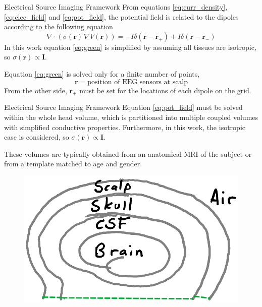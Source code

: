 \documentclass[progressbar=head]{beamer}
\newcommand{\ppar}[1]{ \left( #1 \right) }
\newcommand{\id}{\mathbf{I}}
\newcommand{\rr}{\mathbf{r}}
\begin{document}
\begin{frame}{Electrical Source Imaging Framework}
From equations \eqref{eq:curr_density}, \eqref{eq:elec_field} and \eqref{eq:pot_field}, the potential field is related to the dipoles according to the following equation
\begin{equation}
\nabla \cdot\ppar{\sigma(\rr)\, \nabla V(\rr) } = 
-I \delta\ppar{\rr-\rr_+} + I \delta\ppar{\rr-\rr_-}
\label{eq:green}
\end{equation}
In this work equation \eqref{eq:green} is simplified by assuming 
all tissues are isotropic, so $\sigma(\rr)\propto \id$.

Equation \eqref{eq:green} is solved 
only for a finite number of points, 
\begin{equation*}
    \rr = \text{position of EEG sensors at scalp}
\end{equation*}
From the other side, $\rr_\pm$ must be set for the locations of each dipole on the grid.
\end{frame}

\begin{frame}{Electrical Source Imaging Framework}
Equation \eqref{eq:pot_field} must be solved within the whole head volume, which is partitioned into multiple coupled volumes with simplified conductive properties.
Furthermore, in this work, the isotropic case is considered, so 
$\sigma(\rr) \propto \id$.

These volumes are typically obtained from an anatomical MRI of the subject or from a template matched to age and gender.

\begin{figure}
\centering
\includegraphics[width=0.4\linewidth]{./img_oldbeamer/sketch06}
\end{figure}
\end{frame}
\end{document}
